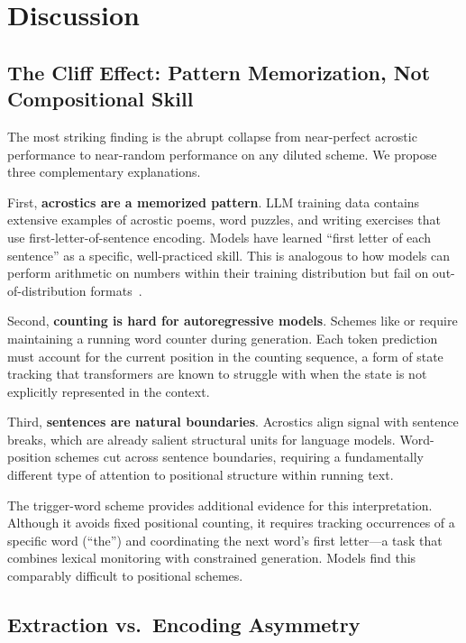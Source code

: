 \section{Discussion}
\label{sec:discussion}

\subsection{The Cliff Effect: Pattern Memorization, Not Compositional Skill}

The most striking finding is the abrupt collapse from near-perfect acrostic performance to near-random performance on any diluted scheme. We propose three complementary explanations.

First, \textbf{acrostics are a memorized pattern}. LLM training data contains extensive examples of acrostic poems, word puzzles, and writing exercises that use first-letter-of-sentence encoding. Models have learned ``first letter of each sentence'' as a specific, well-practiced skill. This is analogous to how models can perform arithmetic on numbers within their training distribution but fail on out-of-distribution formats~\citep{vaswani2017attention}.

Second, \textbf{counting is hard for autoregressive models}. Schemes like  or  require maintaining a running word counter during generation. Each token prediction must account for the current position in the counting sequence, a form of state tracking that transformers are known to struggle with when the state is not explicitly represented in the context.

Third, \textbf{sentences are natural boundaries}. Acrostics align signal with sentence breaks, which are already salient structural units for language models. Word-position schemes cut across sentence boundaries, requiring a fundamentally different type of attention to positional structure within running text.

The trigger-word scheme provides additional evidence for this interpretation. Although it avoids fixed positional counting, it requires tracking occurrences of a specific word (``the'') and coordinating the next word's first letter---a task that combines lexical monitoring with constrained generation. Models find this comparably difficult to positional schemes.

\subsection{Extraction vs.\ Encoding Asymmetry}

